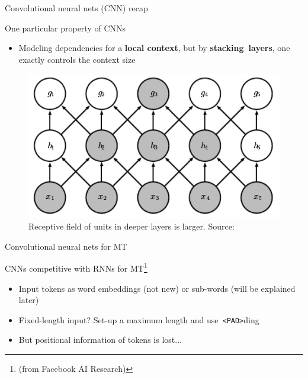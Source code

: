 \documentclass[12pt]{beamer}
\begin{document}
\begin{frame}{Convolutional neural nets (CNN) recap}
	
One particular property of CNNs

\begin{itemize}
	\item Modeling dependencies for a \textbf{local context}, but by \textbf{stacking layers}, one exactly controls the context size
\end{itemize}	


\begin{figure}

\includegraphics[width=0.5\linewidth]{img/dl-book-cnn.png}	
\caption{Receptive field of units in deeper layers is larger. Source: }
\end{figure}
\end{frame}


\begin{frame}{Convolutional neural nets for MT}

CNNs competitive with RNNs for MT\footnote{ (from Facebook AI Research)}

\begin{itemize}
	\item Input tokens as word embeddings (not new) or sub-words (will be explained later)
	\item Fixed-length input? Set-up a maximum length and use \texttt{<PAD>}ding
	\item But positional information of tokens is lost...
\end{itemize}
\end{frame}
\end{document}
